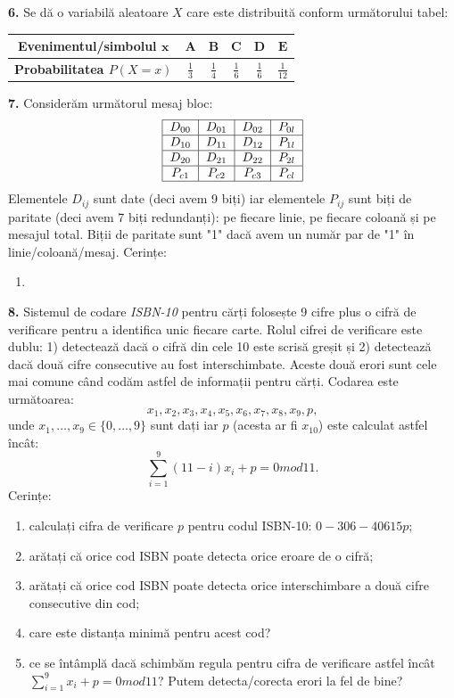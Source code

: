 \documentclass[a4paper]{article}
\begin{document}
\textbf{6.} Se dă o variabilă aleatoare $X$ care este distribuită conform următorului tabel:
\begin{tabular}{|c|c|c|c|c|c|}
\hline
\textbf{Evenimentul/simbolul $\mathbf{x}$} & $\mathbf{A}$ & $\mathbf{B}$ & $\mathbf{C}$ & $\mathbf{D}$ & $\mathbf{E}$ \\
\hline
\textbf{Probabilitatea $P(X = x)$} & $\frac{1}{3}$ & $\frac{1}{4}$ & $\frac{1}{6}$ & $\frac{1}{6}$ & $\frac{1}{12}$ \\
\hline
\end{tabular}


\textbf{7.} Considerăm următorul mesaj bloc:
\[
\begin{tabular}{|c|c|c|c|}
\hline
$D_{00}$ & $D_{01}$ & $D_{02}$ & $P_{0l}$ \\
\hline
$D_{10}$ & $D_{11}$ & $D_{12}$ & $P_{1l}$ \\
\hline
$D_{20}$ & $D_{21}$ & $D_{22}$ & $P_{2l}$ \\
\hline
$P_{c1}$ & $P_{c2}$ & $P_{c3}$ & $P_{cl}$ \\
\hline
\end{tabular}
\]
Elementele $D_{ij}$ sunt date (deci avem 9 biți) iar elementele $P_{ij}$ sunt biți de paritate (deci avem 7 biți redundanți): pe fiecare linie, pe fiecare coloană și pe mesajul total. Biții de paritate sunt "1" dacă avem un număr par de "1" în linie/coloană/mesaj. Cerințe:
\begin{enumerate}[label=(\alph*)]
    \item 
\end{enumerate}

\vspace{0.35cm}

\textbf{8.} Sistemul de codare \textit{ISBN-10} pentru cărți folosește 9 cifre plus o cifră de verificare pentru a identifica unic fiecare carte. Rolul cifrei de verificare este dublu: 1) detectează dacă o cifră din cele 10 este scrisă greșit și 2) detectează dacă două cifre consecutive au fost interschimbate. Aceste două erori sunt cele mai comune când codăm astfel de informații pentru cărți. Codarea este următoarea: \[ x_{1}, x_{2}, x_{3}, x_{4}, x_{5}, x_{6}, x_{7}, x_{8}, x_{9}, p,\] unde $x_{1},\dots,x_{9} \in \{0,\dots,9\}$ sunt dați iar $p$ (acesta ar fi $x_{10}$) este calculat astfel încât: \[ \sum_{i=1}^{9}(11 - i)x_{i} + p = 0 mod 11.\]
Cerințe:
\begin{enumerate}[label=(\alph*)]
    \item calculați cifra de verificare $p$ pentru codul ISBN-10: $0-306-40615p$;
    \item arătați că orice cod ISBN poate detecta orice eroare de o cifră;
    \item arătați că orice cod ISBN poate detecta orice interschimbare a două cifre consecutive din cod;
    \item care este distanța minimă pentru acest cod?
    \item ce se întâmplă dacă schimbăm regula pentru cifra de verificare astfel încât $\sum_{i=1}^{9}x_{i}+p = 0 mod 11$? Putem detecta/corecta erori la fel de bine?
\end{enumerate}
\end{document}
